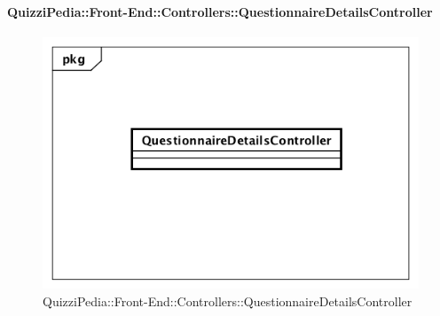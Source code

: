 \paragraph{QuizziPedia::Front-End::Controllers::QuestionnaireDetailsController}
\begin{figure} [ht]
	\centering
	\includegraphics[scale=0.45]{UML/Classi/Front-End/QuizziPedia_Front-end_Controller_QuestionnaireDetailsController.png}
	\caption{QuizziPedia::Front-End::Controllers::QuestionnaireDetailsController}
\end{figure} \FloatBarrier
